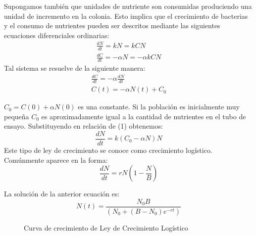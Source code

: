 Supongamos también que unidades de nutriente son consumidas produciendo una unidad de incremento en la colonia. Esto implica que el crecimiento de bacterias y el consumo de nutrientes pueden ser descritos mediante las siguientes ecuaciones diferenciales ordinarias:
\begin{equation}
    \begin{split} %
        \frac{dN}{dt} = kN = kCN\\
        \frac{dC}{dt} = -\alpha N = -\alpha k CN
    \end{split}
\end{equation}
Tal sistema se resuelve de la siguiente manera:
\begin{equation}
    \begin{split}
        \frac{dC}{dt} = -\alpha \frac{dN}{dt}\\
        C(t) = -\alpha N(t) + C_{0}
    \end{split}
\end{equation}
 

$C_{0} = C(0) + \alpha N(0)$ es una constante. Si la población es inicialmente muy pequeña $C_{0}$ es aproximadamente igual a la cantidad de nutrientes en el tubo de ensayo. Substituyendo en relaci\'on de (1) obtenemos:
\begin{equation}
    \frac{dN}{dt} = k(C_{0} - \alpha N)N
\end{equation}
Este tipo de ley de crecimiento se conoce como crecimiento logístico. Comúnmente aparece en la forma:
\begin{equation}
    \frac{dN}{dt} = rN(1 - \frac{N}{B})
\end{equation}

La soluci\'on de la anterior ecuaci\'on es:
\begin{equation}
    N(t) = \frac{N_{0}B}{(N_{0} + (B - N_{0})e^{-rt})}
\end{equation}
\begin{figure}[!ht]
\begin{center}
\end{center}\vspace*{-0.6cm}
\caption[Imagen de Oncogenes. Falta poner leyenda]{Curva de crecimiento de Ley de Crecimiento Log\'istico}
\label{fig-logistico}
\end{figure}

